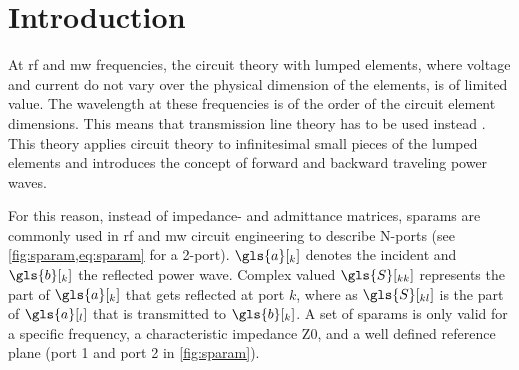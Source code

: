 \documentclass[12pt,a4paper,parskip=full,abstract=true,BCOR=12mm,twoside,open=right]{scrreprt}
\begin{document}
\chapter{Introduction}
\label{chap:introduction}

At \gls{rf} and \gls{mw} frequencies, the circuit theory with lumped elements, where
voltage and current do not vary over the physical dimension of the elements, is of limited
value. The wavelength at these frequencies is of the order of the circuit
element dimensions. This means that transmission line theory has to be used instead \cite{pozar_mw_engineering_2011}.
This theory applies circuit theory to infinitesimal small pieces of the lumped elements
and introduces the concept of forward and backward traveling power waves.

For this reason, instead of impedance- and admittance matrices, \glspl{sparam}
are commonly used in \gls{rf} and \gls{mw} circuit engineering to describe
N-ports (see \cref{fig:sparam,eq:sparam} for a 2-port). $\gls{a}[_k]$ denotes the incident and
$\gls{b}[_k]$ the reflected power wave. Complex valued $\gls{S}[_{kk}]$ represents the
part of $\gls{a}[_k]$ that gets reflected at port $k$, where as $\gls{S}[_{kl}]$ is the part of $\gls{a}[_l]$ that
is transmitted to $\gls{b}[_k]$. A set of \glspl{sparam} is only valid for a specific frequency, a
characteristic impedance \gls{Z0}, and a well defined reference plane (port 1 and port 2 in \cref{fig:sparam}).
\end{document}
